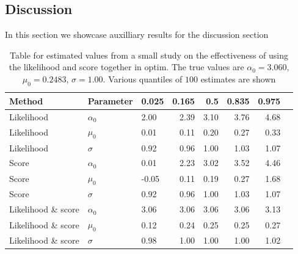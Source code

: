 \subsection{Discussion}
In this section we showcase auxilliary results for the discussion section
\begin{table}[ht]
    \centering
    \begin{tabular}{lllrrrrr}
      \hline 
     Method              & Parameter & 0.025 & 0.165 & 0.5 & 0.835 & 0.975 \\ \hline
     Likelihood          & $\alpha_0$ & 2.00 & 2.39 & 3.10 & 3.76 & 4.68 \\ 
     Likelihood          & $\mu_0$ & 0.01 & 0.11 & 0.20 & 0.27 & 0.33 \\ 
     Likelihood          & $\sigma$ & 0.92 & 0.96 & 1.00 & 1.03 & 1.07 \\ 
     Score               & $\alpha_0$ & 0.01 & 2.23 & 3.02 & 3.52 & 4.46 \\ 
     Score               & $\mu_0$ & -0.05 & 0.11 & 0.19 & 0.27 & 1.68 \\ 
     Score               & $\sigma$ & 0.92 & 0.96 & 1.00 & 1.03 & 1.07 \\ 
     Likelihood \& score & $\alpha_0$ & 3.06 & 3.06 & 3.06 & 3.06 & 3.13 \\ 
     Likelihood \& score & $\mu_0$ & 0.12 & 0.24 & 0.25 & 0.25 & 0.27 \\ 
     Likelihood \& score & $\sigma$ & 0.98 & 1.00 & 1.00 & 1.00 & 1.02 \\ 
       \hline
    \end{tabular}
    \caption{Table for estimated values from a small study on the effectiveness of using the likelihood and score together in optim. The true values are $\alpha_0 = 3.060$, $\mu_0 = 0.2483$, $\sigma = 1.00$. Various quantiles of $100$ estimates are shown}
    \label{table:smallOUExperiment}
    \end{table}